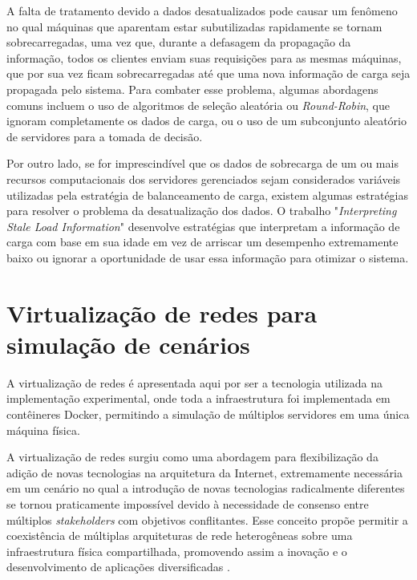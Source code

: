 A falta de tratamento devido a dados desatualizados pode causar um fenômeno no qual máquinas que aparentam estar subutilizadas rapidamente se tornam sobrecarregadas, uma vez que, durante a defasagem da propagação da informação, todos os clientes enviam suas requisições para as mesmas máquinas, que por sua vez ficam sobrecarregadas até que uma nova informação de carga seja propagada pelo sistema. Para combater esse problema, algumas abordagens comuns incluem o uso de algoritmos de seleção aleatória ou \textit{Round-Robin}, que ignoram completamente os dados de carga, ou o uso de um subconjunto aleatório de servidores para a tomada de decisão.

Por outro lado, se for imprescindível que os dados de sobrecarga de um ou mais recursos computacionais dos servidores gerenciados sejam considerados variáveis utilizadas pela estratégia de balanceamento de carga, existem algumas estratégias para resolver o problema da desatualização dos dados. O trabalho "\textit{Interpreting Stale Load Information}" \cite{interpretingStaleLoadInformation2000} desenvolve estratégias que interpretam a informação de carga com base em sua idade em vez de arriscar um desempenho extremamente baixo ou ignorar a oportunidade de usar essa informação para otimizar o sistema.

\section{Virtualização de redes para simulação de cenários}

A virtualização de redes é apresentada aqui por ser a tecnologia utilizada na implementação experimental, onde toda a infraestrutura foi implementada em contêineres Docker, permitindo a simulação de múltiplos servidores em uma única máquina física.

A virtualização de redes surgiu como uma abordagem para flexibilização da adição de novas tecnologias na arquitetura da Internet, extremamente necessária em um cenário no qual a introdução de novas tecnologias radicalmente diferentes se tornou praticamente impossível devido à necessidade de consenso entre múltiplos \textit{stakeholders} com objetivos conflitantes. Esse conceito propõe permitir a coexistência de múltiplas arquiteturas de rede heterogêneas sobre uma infraestrutura física compartilhada, promovendo assim a inovação e o desenvolvimento de aplicações diversificadas \cite{aSurveyOfNetworkVirtualization2010}.

